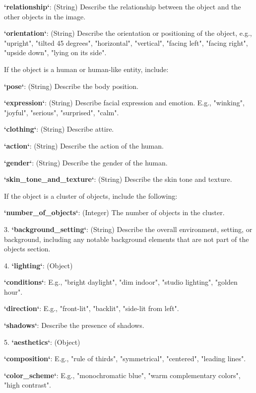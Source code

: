 \begin{table}[t]
\begin{tcolorbox}
\quad    * \textbf{`relationship`}: (String) Describe the relationship between the object and the other objects in the image.
    
\quad    * \textbf{`orientation`}: (String) Describe the orientation or positioning of the object, e.g., "upright", "tilted 45 degrees", "horizontal", "vertical", "facing left", "facing right", "upside down", "lying on its side".
    
If the object is a human or human-like entity, include:

\quad * \textbf{`pose`}: (String) Describe the body position.

\quad * \textbf{`expression`}: (String) Describe facial expression and emotion. E.g., "winking", "joyful", "serious", "surprised", "calm".

\quad        * \textbf{`clothing`}: (String) Describe attire.

\quad        * \textbf{`action`}: (String) Describe the action of the human.

\quad        * \textbf{`gender`}: (String) Describe the gender of the human.
        
\quad        * \textbf{`skin\_tone\_and\_texture`}: (String) Describe the skin tone and texture.

        
If the object is a cluster of objects, include the following:

\quad        * \textbf{`number\_of\_objects`}: (Integer) The number of objects in the cluster.


3. \textbf{`background\_setting`}: (String) Describe the overall environment, setting, or background, including any notable background elements that are not part of the objects section.


4. \textbf{`lighting`}: (Object)

\quad    * \textbf{`conditions`}: E.g., "bright daylight", "dim indoor", "studio lighting", "golden hour".
    
\quad    * \textbf{`direction`}: E.g., "front-lit", "backlit", "side-lit from left".
    
\quad    * \textbf{`shadows`}: Describe the presence of shadows.

5. \textbf{`aesthetics`}: (Object)

\quad    * \textbf{`composition`}: E.g., "rule of thirds", "symmetrical", "centered", "leading lines".

\quad    * \textbf{`color\_scheme`}: E.g., "monochromatic blue", "warm complementary colors", "high contrast".


\end{tcolorbox}
\end{table}

